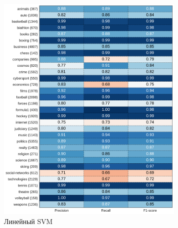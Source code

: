 \documentclass[a4paper, 14pt]{extarticle}
\begin{document}
\begin{figure}[t!]
	\centering
	\begin{subfigure}[t]{0.5\textwidth}
		\centering
		\hspace*{-2cm}
		\includegraphics[width=1\textwidth]{svm_classif_report.pdf}
		\caption{Линейный SVM}
		\label{svm_classif_report}
	\end{subfigure}%
	~ 
	\begin{subfigure}[t]{0.5\textwidth}
		\centering
		\hspace*{-2cm}

\end{subfigure}
\end{figure}
\end{document}
